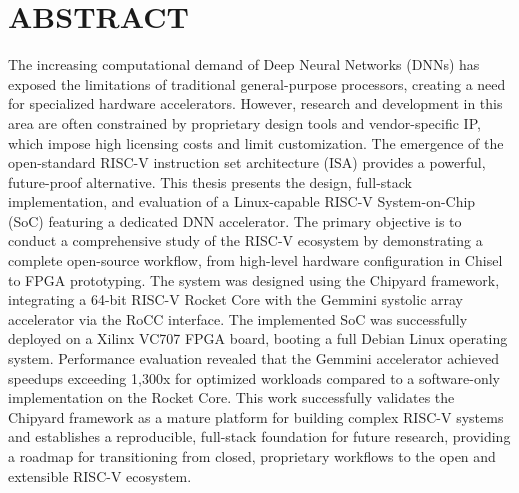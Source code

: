 \chapter*{ABSTRACT}
\label{Abstract-EN}

The increasing computational demand of Deep Neural Networks (DNNs) has exposed the limitations of traditional general-purpose processors, creating a need for specialized hardware accelerators. However, research and development in this area are often constrained by proprietary design tools and vendor-specific IP, which impose high licensing costs and limit customization. The emergence of the open-standard RISC-V instruction set architecture (ISA) provides a powerful, future-proof alternative. This thesis presents the design, full-stack implementation, and evaluation of a Linux-capable RISC-V System-on-Chip (SoC) featuring a dedicated DNN accelerator. The primary objective is to conduct a comprehensive study of the RISC-V ecosystem by demonstrating a complete open-source workflow, from high-level hardware configuration in Chisel to FPGA prototyping. The system was designed using the Chipyard framework, integrating a 64-bit RISC-V Rocket Core with the Gemmini systolic array accelerator via the RoCC interface. The implemented SoC was successfully deployed on a Xilinx VC707 FPGA board, booting a full Debian Linux operating system. Performance evaluation revealed that the Gemmini accelerator achieved speedups exceeding 1,300x for optimized workloads compared to a software-only implementation on the Rocket Core. This work successfully validates the Chipyard framework as a mature platform for building complex RISC-V systems and establishes a reproducible, full-stack foundation for future research, providing a roadmap for transitioning from closed, proprietary workflows to the open and extensible RISC-V ecosystem.


